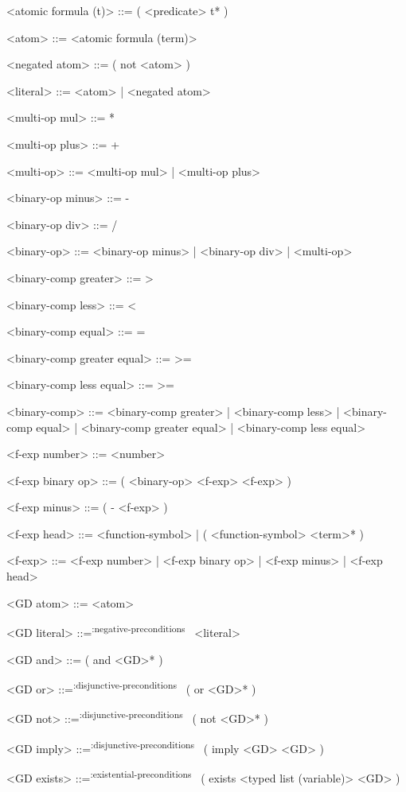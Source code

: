 \documentclass[]{article}
\newcommand{\negativepreconditions}{\textsuperscript{:negative-preconditions}~}
\newcommand{\disjunctivepreconditions}{\textsuperscript{:disjunctive-preconditions}~}
\newcommand{\existentialpreconditions}{\textsuperscript{:existential-preconditions}~}
\begin{document}
\begin{grammar}
    <atomic formula (t)> ::= ( <predicate> t* )

    <atom> ::= <atomic formula (term)>

    <negated atom> ::= ( not <atom> )

    <literal> ::= <atom> | <negated atom>


    <multi-op mul> ::= *

    <multi-op plus> ::= +

    <multi-op> ::= <multi-op mul> | <multi-op plus>

    <binary-op minus> ::= -

    <binary-op div> ::= /

    <binary-op> ::= <binary-op minus> | <binary-op div> | <multi-op>


    <binary-comp greater> ::= >

    <binary-comp less> ::= \textless

    <binary-comp equal> ::= =

    <binary-comp greater equal> ::= >=

    <binary-comp less equal> ::= \textgreater=

    <binary-comp> ::= <binary-comp greater> | <binary-comp less> \newline
        | <binary-comp equal> | <binary-comp greater equal> \newline
        | <binary-comp less equal>


    <f-exp number> ::= <number>

    <f-exp binary op> ::= ( <binary-op> <f-exp> <f-exp> )

    <f-exp minus> ::= ( - <f-exp> )

    <f-exp head> ::= <function-symbol> | ( <function-symbol> <term>* )

    <f-exp> ::= <f-exp number> | <f-exp binary op> | <f-exp minus> | <f-exp head>

    <GD atom> ::= <atom>

    <GD literal> ::=\negativepreconditions{} <literal>

    <GD and> ::=  ( and <GD>* )

    <GD or> ::=\disjunctivepreconditions{} ( or <GD>* )

    <GD not> ::=\disjunctivepreconditions{} ( not <GD>* )

    <GD imply> ::=\disjunctivepreconditions{} ( imply <GD> <GD> )

    <GD exists> ::=\existentialpreconditions{} ( exists <typed list (variable)> <GD> )


\end{grammar}
\end{document}
